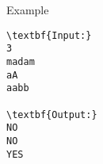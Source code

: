 Example
\begin{verbatim}
\textbf{Input:}
3
madam
aA
aabb

\textbf{Output:}
NO
NO
YES 
\end{verbatim}